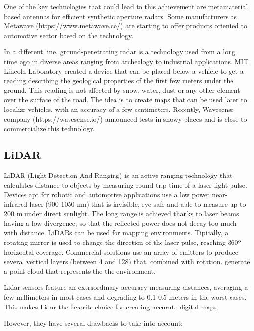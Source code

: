 One of the key technologies that could lead to this achievement are metamaterial
based antennas \cite{Brookner2016,Sleasman2017} for efficient synthetic aperture
radars. Some manufacturers as Metawave (https://www.metawave.co/) are starting 
to offer products oriented to automotive sector based on the technology.

In a different line, ground-penetrating radar is a technology used from a long
time ago in diverse areas ranging from archeology to industrial applications.
MIT Lincoln Laboratory created a device \cite{Cornick2016} that can be placed 
below a vehicle to get a reading describing the geological properties of the
first few meters under the ground. This reading is not affected by snow, 
water, dust or any other element over the surface of the road. The idea is to
create maps that can be used later to localize vehicles, with an accuracy of
a few centimeters. \cite{XXXX}
Recently, Wavesense company (https://wavesense.io/) announced tests in snowy
places and is close to commercialize this technology.



\subsection{LiDAR}
LiDAR (Light Detection And Ranging) is an active ranging technology that calculates distance to objects by measuring round trip time of a laser light pulse.
Devices apt for robotic and automotive applications use a low power 
near-infrared laser (900-1050 nm) that is invisible, eye-safe and able to 
measure up to 200 m under direct sunlight. The long range is achieved thanks to
laser beams having a low divergence, so that the reflected power does not decay
too much with distance.
LiDARs can be used for mapping environments. Tipically, a rotating mirror is used to change the direction of the laser pulse, reaching 360º horizontal coverage. Commercial solutions use an array of emitters to produce several vertical layers (between 4 and 128) that, combined with rotation, generate a point cloud that represents the the environment.

Lidar sensors feature an extraordinary accuracy measuring distances, averaging
a few millimeters in most cases and degrading to 0.1-0.5 meters in the worst 
cases. This makes Lidar the favorite choice for creating accurate digital maps.

However, they have several drawbacks to take into account:

